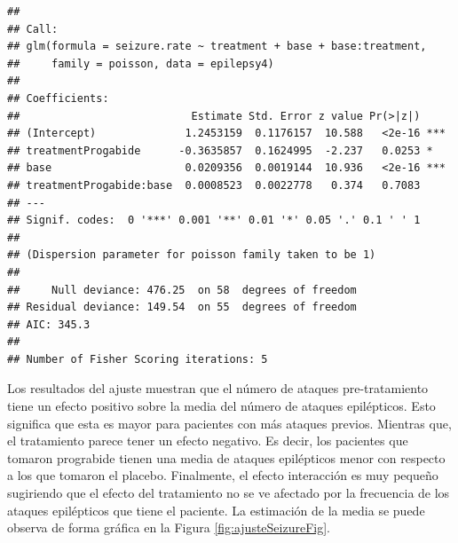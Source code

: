 \documentclass[
]{article}
\begin{document}
\begin{verbatim}
## 
## Call:
## glm(formula = seizure.rate ~ treatment + base + base:treatment, 
##     family = poisson, data = epilepsy4)
## 
## Coefficients:
##                           Estimate Std. Error z value Pr(>|z|)    
## (Intercept)              1.2453159  0.1176157  10.588   <2e-16 ***
## treatmentProgabide      -0.3635857  0.1624995  -2.237   0.0253 *  
## base                     0.0209356  0.0019144  10.936   <2e-16 ***
## treatmentProgabide:base  0.0008523  0.0022778   0.374   0.7083    
## ---
## Signif. codes:  0 '***' 0.001 '**' 0.01 '*' 0.05 '.' 0.1 ' ' 1
## 
## (Dispersion parameter for poisson family taken to be 1)
## 
##     Null deviance: 476.25  on 58  degrees of freedom
## Residual deviance: 149.54  on 55  degrees of freedom
## AIC: 345.3
## 
## Number of Fisher Scoring iterations: 5
\end{verbatim}

Los resultados del ajuste muestran que el número de ataques pre-tratamiento tiene un efecto positivo sobre la media del número de ataques epilépticos. Esto significa que esta es mayor para pacientes con más ataques previos. Mientras que, el tratamiento parece tener un efecto negativo. Es decir, los pacientes que tomaron prograbide tienen una media de ataques epilépticos menor con respecto a los que tomaron el placebo. Finalmente, el efecto interacción es muy pequeño sugiriendo que el efecto del tratamiento no se ve afectado por la frecuencia de los ataques epilépticos que tiene el paciente. La estimación de la media se puede observa de forma gráfica en la Figura \ref{fig:ajusteSeizureFig}.
\end{document}
